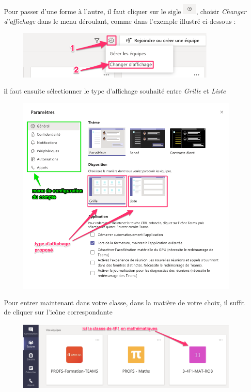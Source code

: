 \documentclass{article}
\begin{document}
Pour passer d'une forme à l'autre, il faut cliquer sur le sigle \includegraphics[width=0.7cm]{bouton_parametres.png}, choisir \textit{Changer d'affichage} dans le menu déroulant, comme dans l'exemple illustré ci-dessous :

\begin{figure}[h]
\includegraphics[width=10cm]{changement_liste.png}
\centering
\end{figure}

il faut ensuite sélectionner le type d'affichage souhaité entre \textit{Grille} et \textit{Liste}
\newpage

\begin{figure}[h]
\includegraphics[width=12cm]{choix_parametre.png}
\centering
\end{figure}

 Pour entrer maintenant dans votre classe, dans la matière de votre choix, il suffit de cliquer sur l'icône correspondante

\begin{figure}[h]
\includegraphics[width=12cm]{entree_classe.png}
\centering
\end{figure}
\end{document}

